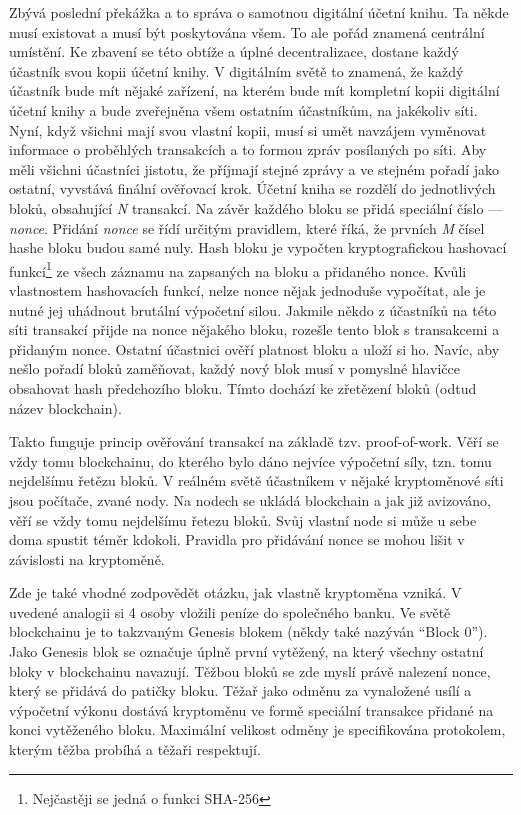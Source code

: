 Zbývá poslední překážka a to správa o samotnou digitální účetní knihu. Ta někde musí existovat a musí být poskytována všem. To ale pořád
znamená centrální umístění. Ke zbavení se této obtíže a úplné decentralizace, dostane každý účastník svou kopii účetní knihy. V digitálním světě
to znamená, že
každý účastník bude mít nějaké zařízení, na kterém bude mít kompletní kopii digitální účetní knihy a bude zveřejněna všem ostatním účastníkům,
na jakékoliv síti. Nyní, když všichni mají svou vlastní kopii, musí si umět navzájem vyměnovat informace o proběhlých transakcích a to formou
zpráv posílaných po síti. Aby měli všichni účastníci jistotu, že příjmají stejné zprávy a ve stejném pořadí jako ostatní, vyvstává finální
ověřovací krok. Účetní kniha se rozdělí do jednotlivých bloků, obsahující \emph{N} transakcí. Na závěr každého bloku se přidá speciální
číslo --- \emph{nonce}. Přidání \emph{nonce} se řídí určitým pravidlem, které říká, že prvních \emph{M} čísel hashe bloku budou samé nuly.
Hash bloku je vypočten kryptografickou hashovací funkcí\footnote{Nejčastěji se jedná o funkci SHA-256} ze všech záznamu na zapsaných na bloku
a přidaného nonce. Kvůli vlastnostem hashovacích funkcí, nelze nonce nějak jednoduše vypočítat, ale je nutné jej uhádnout brutální výpočetní silou.
Jakmile někdo z účastníků na této síti transakcí přijde na nonce nějakého bloku, rozešle tento blok s transakcemi a přidaným nonce.
Ostatní účastnici ověří platnost bloku a uloží si ho. Navíc, aby nešlo pořadí bloků zaměňovat, každý nový blok musí v pomyslné hlavičce
obsahovat hash předchozího bloku. Tímto dochází ke zřetězení bloků (odtud název blockchain).

Takto funguje princip ověřování transakcí na základě tzv. proof-of-work. Věří se vždy tomu blockchainu, do kterého bylo dáno nejvíce
výpočetní síly, tzn. tomu nejdelšímu řetězu bloků. V reálném světě účastníkem v nějaké kryptoměnové síti jsou počítače, zvané nody.
Na nodech se ukládá blockchain a jak již avizováno, věří se vždy tomu nejdelšímu řetezu bloků. Svůj vlastní node si může u sebe doma spustit
téměr kdokoli. Pravidla pro přidávání nonce se mohou lišit v závislosti na kryptoměně.

Zde je také vhodné zodpovědět otázku, jak vlastně kryptoměna vzniká. V uvedené analogii si 4 osoby vložili peníze do společného banku.
Ve světě blockchainu je to takzvaným Genesis blokem (někdy také nazýván \enquote{Block 0}). Jako Genesis blok se označuje úplně první
vytěžený, na který všechny ostatní bloky v blockchainu navazují. Těžbou bloků se zde myslí právě nalezení nonce, který se přidává do patičky
bloku. Těžař jako odměnu za vynaložené usílí a výpočetní výkonu dostává kryptoměnu ve formě speciální transakce přidané na konci vytěženého bloku.
Maximální velikost odměny je specifikována protokolem, kterým těžba probíhá a těžaři respektují.


